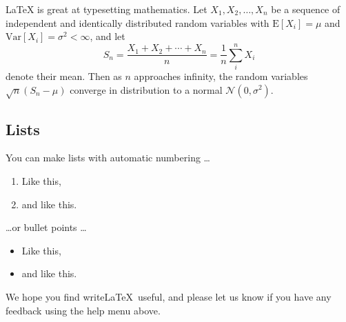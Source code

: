 \documentclass[letter,man,noextraspace,floatsintext]{apa6}
\begin{document}
\LaTeX{} is great at typesetting mathematics. Let $X_1, X_2, \ldots, X_n$ be a sequence of independent and identically distributed random variables with $\text{E}[X_i] = \mu$ and $\text{Var}[X_i] = \sigma^2 < \infty$, and let
$$S_n = \frac{X_1 + X_2 + \cdots + X_n}{n}
      = \frac{1}{n}\sum_{i}^{n} X_i$$
denote their mean. Then as $n$ approaches infinity, the random variables $\sqrt{n}(S_n - \mu)$ converge in distribution to a normal $\mathcal{N}(0, \sigma^2)$.

\subsection{Lists}

You can make lists with automatic numbering \dots

\begin{enumerate}
\item Like this,
\item and like this.
\end{enumerate}
\dots or bullet points \dots
\begin{itemize}
\item Like this,
\item and like this.
\end{itemize}

We hope you find write\LaTeX\ useful, and please let us know if you have any feedback using the help menu above.


\printbibliography
\end{document}
